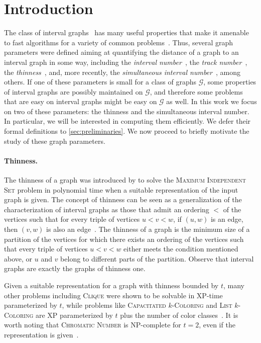 \documentclass[11pt]{article}
\theoremstyle{plain}
\theoremstyle{definition}
\theoremstyle{remark}
\newcommand{\G}{\mathcal{G}}
\newcommand{\XP}{{\smaller[0.83]\textsf{\textup{XP}}}\xspace}
\newcommand{\NP}{{\smaller[0.83]\textsf{\textup{NP}}}}
\begin{document}
\section{Introduction}
\label{sec:intro} 
The class of interval graphs~\citep{interval-graphs} has many useful properties that make it amenable to fast algorithms for a variety of common problems~\citep{Ola-interval,R-PR-interval}. Thus, several graph parameters were defined aiming at quantifying the distance of a graph to an interval graph in some way, including the \emph{interval number}~\citep{interval-number}, the \emph{track number}~\citep{multitrack-interval-graphs}, the \emph{thinness}~\citep{M-O-R-C-thinness}, and, more recently, the \emph{simultaneous interval number}~\citep{Milanic-sim}, among others. If one of these parameters is small for a class of graphs $\G$, some properties of interval graphs are possibly maintained on $\G$, and therefore some problems that are easy on interval graphs might be easy on $\G$ as well. In this work we focus on two of these parameters: the thinness and the simultaneous interval number. In particular, we will be interested in computing them efficiently. We defer their formal definitions to \cref{sec:preliminaries}. We now proceed to briefly motivate the study of these graph parameters.


\paragraph{Thinness.} The thinness of a graph was introduced by \citet{M-O-R-C-thinness} to solve the \textsc{Maximum Independent Set} problem in polynomial time when a suitable representation of the input graph is given. The concept of thinness can be seen as a generalization of the characterization of interval graphs as those that admit an ordering $<$ of the vertices such that for every triple of vertices $u < v < w$, if $(u,w)$ is an edge, then $(v,w)$ is also an edge~\citep{forbidden-ordered-subgraphs,Ola-interval}. The thinness of a graph is the minimum size of a partition of the vertices for which there exists an ordering of the vertices such that every triple of vertices $u < v < w$ either meets the condition mentioned above, or $u$ and $v$ belong to different parts of the partition. Observe that interval graphs are exactly the graphs of thinness one.

Given a suitable representation for a graph with thinness bounded by $t$, many other problems including \textsc{Clique} were shown to be solvable in \XP-time parameterized by $t$, while problems like \textsc{Capacitated $k$-Coloring} and \textsc{List $k$-Coloring} are \XP parameterized by $t$ plus the number of color classes~\citep{M-O-R-C-thinness,B-M-O-thin-tcs,tesis-diego,C-T-V-Z--H-top-thin}. It is worth noting that \textsc{Chromatic Number} is \NP-complete for $t=2$, even if the representation is given~\citep{BBOSSS-thin-coloring}.
\end{document}
